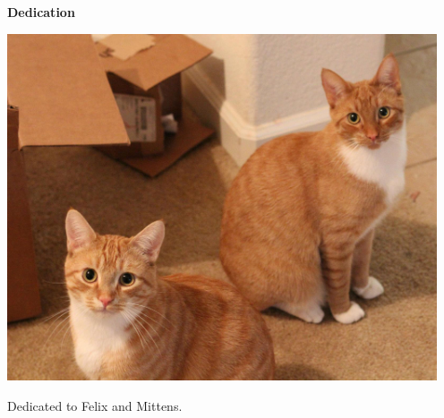 \newpage
{}
\begin{center}
\textbf{Dedication}

\vspace{0.2in}

\includegraphics[height=\textheight,width=5in,keepaspectratio]{figures/felixmittens.jpg}

\vspace{1in}

Dedicated to Felix and Mittens.



\end{center}
